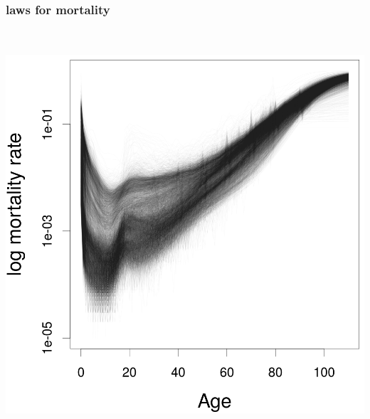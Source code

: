 \documentclass[20pt]{beamer}
\begin{document}
\begin{frame}
\frametitle{laws for mortality}
\vspace{-1em}
\begin{center}
\includegraphics[height=6in]{Figures/Mortality1.png}
\end{center}
\end{frame}
\end{document}
